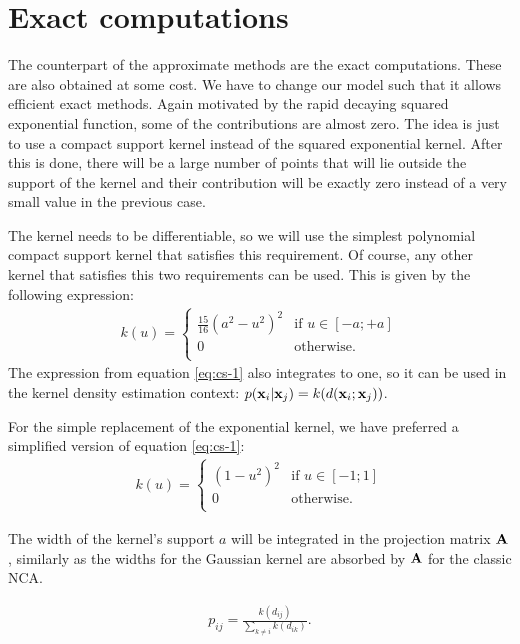 \section{Exact computations}
\label{sec:exact-computations}

The counterpart of the approximate methods are the exact computations. These are also obtained at some cost. We have to change our model such that it allows efficient exact methods. Again motivated by the rapid decaying squared exponential function, some of the contributions are almost zero. The idea is just to use a compact support kernel instead of the squared exponential kernel. After this is done, there will be a large number of points that will lie outside the support of the kernel and their contribution will be exactly zero instead of a very small value in the previous case.

The kernel needs to be differentiable, so we will use the simplest polynomial compact support kernel that satisfies this requirement. Of course, any other kernel that satisfies this two requirements can be used. This is given by the following expression:
\begin{align}
	k(u)=\begin{cases}
		\frac{15}{16}(a^2-u^2)^2& \mbox{if } u \in [-a;+a]\\
		0& \mbox{otherwise}.\\
	\end{cases}
	\label{eq:cs-1}
\end{align}
The expression from equation \ref{eq:cs-1} also integrates to one, so it can be used in the kernel density estimation context: $p(\mathbf{x}_i|\mathbf{x}_j) = k(d(\mathbf{x}_i;\mathbf{x}_j))$. 

For the simple replacement of the exponential kernel, we have preferred a simplified version of equation \ref{eq:cs-1}: 
	\begin{align}
		k(u)=\begin{cases}
				(1-u^2)^2& \mbox{if } u \in [-1;1]\\
				0& \mbox{otherwise}.\\
			\end{cases}
			\label{eq:cs-2}
	\end{align}
	
	The width of the kernel's support $a$ will be integrated in the projection matrix $\mathbf{A}$, similarly as the widths for the Gaussian kernel are absorbed by $\mathbf{A}$ for the classic NCA.

\begin{align}
	p_{ij} = \frac{k(d_{ij})}{\sum_{k\neq i} k(d_{ik})}.
\end{align}

